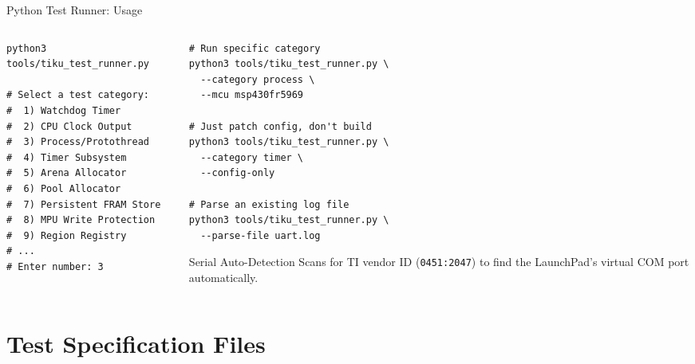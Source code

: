 \documentclass[aspectratio=169, 10pt]{beamer}
\begin{document}
\begin{frame}[fragile]{Python Test Runner: Usage}
\begin{columns}[T]
\begin{column}{0.48\textwidth}
\begin{lstlisting}[style=bashstyle, title={Interactive mode}]
python3 tools/tiku_test_runner.py

# Select a test category:
#  1) Watchdog Timer
#  2) CPU Clock Output
#  3) Process/Protothread
#  4) Timer Subsystem
#  5) Arena Allocator
#  6) Pool Allocator
#  7) Persistent FRAM Store
#  8) MPU Write Protection
#  9) Region Registry
# ...
# Enter number: 3
\end{lstlisting}
\end{column}

\begin{column}{0.48\textwidth}
\begin{lstlisting}[style=bashstyle, title={Non-interactive / CI mode}]
# Run specific category
python3 tools/tiku_test_runner.py \
  --category process \
  --mcu msp430fr5969

# Just patch config, don't build
python3 tools/tiku_test_runner.py \
  --category timer \
  --config-only

# Parse an existing log file
python3 tools/tiku_test_runner.py \
  --parse-file uart.log
\end{lstlisting}

\vspace{0.3em}
\begin{block}{Serial Auto-Detection}
Scans for TI vendor ID (\texttt{0451:2047}) to find the
LaunchPad's virtual COM port automatically.
\end{block}
\end{column}
\end{columns}
\end{frame}

\section{Test Specification Files}
\end{document}

